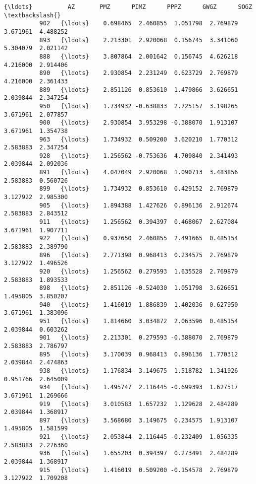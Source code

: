 \documentclass[11pt]{article}
\begin{document}
\begin{Verbatim}[commandchars=\\\{\}]
                {\ldots}          AZ       PMZ      PIMZ      PPPZ      GWGZ      SOGZ  \textbackslash{}
          902   {\ldots}    0.698465  2.460855  1.051798  2.769879  3.671961  4.488252   
          893   {\ldots}    2.213301  2.920068  0.156745  3.341060  5.304079  2.021142   
          888   {\ldots}    3.807864  2.001642  0.156745  4.626218  4.216000  2.914406   
          890   {\ldots}    2.930854  2.231249  0.623729  2.769879  4.216000  2.361433   
          889   {\ldots}    2.851126  0.853610  1.479866  3.626651  2.039844  2.347254   
          950   {\ldots}    1.734932 -0.638833  2.725157  3.198265  3.671961  2.077857   
          900   {\ldots}    2.930854  3.953298 -0.388070  1.913107  3.671961  1.354738   
          963   {\ldots}    1.734932  0.509200  3.620210  1.770312  2.583883  2.347254   
          928   {\ldots}    1.256562 -0.753636  4.709840  2.341493  2.039844  2.092036   
          891   {\ldots}    4.047049  2.920068  1.090713  3.483856  2.583883  0.560726   
          899   {\ldots}    1.734932  0.853610  0.429152  2.769879  3.127922  2.985300   
          905   {\ldots}    1.894388  1.427626  0.896136  2.912674  2.583883  2.843512   
          911   {\ldots}    1.256562  0.394397  0.468067  2.627084  3.671961  1.907711   
          922   {\ldots}    0.937650  2.460855  2.491665  0.485154  2.583883  2.389790   
          896   {\ldots}    2.771398  0.968413  0.234575  2.769879  3.127922  1.496526   
          920   {\ldots}    1.256562  0.279593  1.635528  2.769879  2.583883  1.893533   
          898   {\ldots}    2.851126 -0.524030  1.051798  3.626651  1.495805  3.850207   
          940   {\ldots}    1.416019  1.886839  1.402036  0.627950  3.671961  1.383096   
          951   {\ldots}    1.814660  3.034872  2.063596  0.485154  2.039844  0.603262   
          901   {\ldots}    2.213301  0.279593 -0.388070  2.769879  2.583883  2.786797   
          895   {\ldots}    3.170039  0.968413  0.896136  1.770312  2.039844  2.474863   
          938   {\ldots}    1.176834  3.149675  1.518782  1.341926  0.951766  2.645009   
          934   {\ldots}    1.495747  2.116445 -0.699393  1.627517  3.671961  1.269666   
          919   {\ldots}    3.010583  1.657232  1.129628  2.484289  2.039844  1.368917   
          897   {\ldots}    3.568680  3.149675  0.234575  1.913107  1.495805  1.581599   
          921   {\ldots}    2.053844  2.116445 -0.232409  1.056335  2.583883  2.276360   
          936   {\ldots}    1.655203  0.394397  0.273491  2.484289  2.039844  1.368917   
          915   {\ldots}    1.416019  0.509200 -0.154578  2.769879  3.127922  1.709208   

\end{Verbatim}
\end{document}
